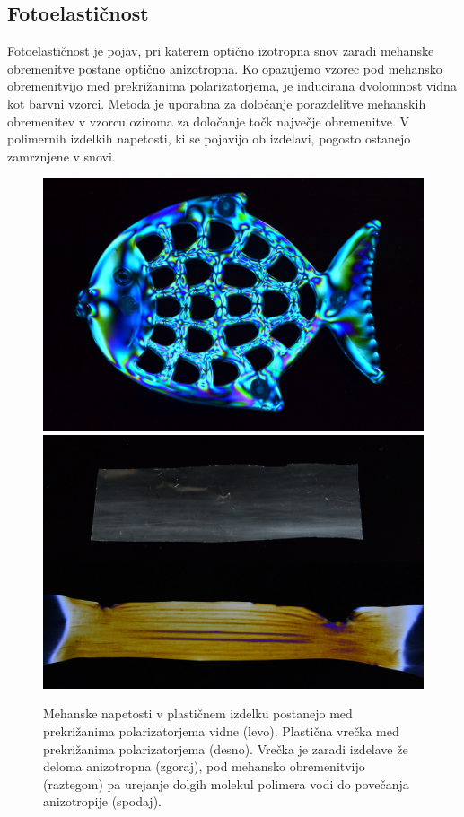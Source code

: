\subsection*{Fotoelastičnost}
Fotoelastičnost je pojav, pri katerem optično izotropna snov zaradi mehanske obremenitve 
postane optično anizotropna. Ko opazujemo vzorec pod mehansko obremenitvijo med prekrižanima
polarizatorjema, je inducirana dvolomnost vidna kot barvni vzorci. Metoda je uporabna za 
določanje porazdelitve mehanskih obremenitev v vzorcu oziroma za določanje točk največje 
obremenitve. V polimernih izdelkih napetosti, ki se pojavijo ob izdelavi, 
pogosto ostanejo zamrznjene v snovi.
\begin{figure}[ht]
\centering
\includegraphics[width=7truecm]{slike/10_fotoelasticnost1.jpg}\hfill
\includegraphics[width=7truecm]{slike/10_fotoelasticnost2.jpg}
\caption{Mehanske napetosti v plastičnem izdelku postanejo med prekrižanima 
polarizatorjema vidne (levo). Plastična vrečka med prekrižanima polarizatorjema (desno).
Vrečka je zaradi izdelave že deloma anizotropna (zgoraj), 
pod mehansko obremenitvijo (raztegom) pa urejanje dolgih molekul polimera vodi 
do povečanja anizotropije (spodaj).}
\label{fig:10_fotoelasticnost}
\end{figure}


